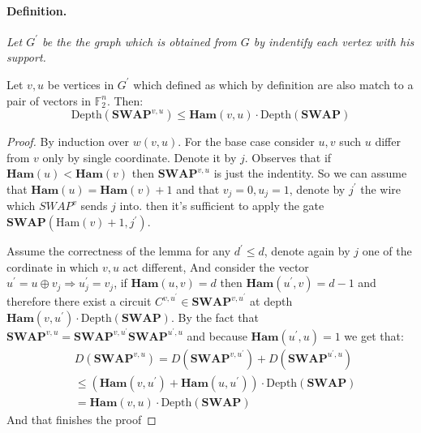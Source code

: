\documentclass{article}
\begin{document}
\paragraph{Definition.} \textit{ Let $G^\prime$ be the the graph which is obtained from $G$ by indentify each vertex with his support. }
\begin{lemma}  Let \(v,u\) be vertices in \(G^{\prime}\) which defined as   which by definition are also match to a pair of vectors in \(\mathbb{F}_2^{n} \). Then: 
  \begin{equation*}
    \text{Depth}\left(\textbf{SWAP}^{v,u}\right) \le \textbf{Ham}(v,u)\cdot \text{Depth}\left(\textbf{SWAP}\right)
  \end{equation*}
\end{lemma}
\begin{proof} By induction over \(w(v,u)\). For the base case consider \(u,v\) such \(u\) differ from \(v\) only by single coordinate. Denote it by \(j\). Observes that if $\textbf{Ham}(u) <\textbf{Ham}(v)$ then $\textbf{SWAP}^{v,u}$ is just the indentity. So we can assume that $ \textbf{Ham}(u) = \textbf{Ham}(v)+1 $ and that  \(v_j = 0, u_j =1\), denote by \(j^{\prime}\) the wire which \(SWAP^{v}\) sends \(j\) into. then it's sufficient to apply the gate \(\textbf{SWAP}(\text{Ham}(v) +1, j^\prime) \).

  Assume the correctness of the lemma for any \(d^\prime \le d\), denote again by $j$ one of the cordinate in which $v,u$ act different, And consider the vector \(u^\prime = u \oplus v_{j} \Rightarrow u^{\prime}_{j} = v_{j}\), if \( \textbf{Ham}(u,v) = d\) then \( \textbf{Ham}(u^\prime,v) = d-1\) and therefore there exist a circuit \(C^{v,u^\prime}\in \textbf{SWAP}^{v,u^\prime}\) at depth \( \textbf{Ham}(v,u^\prime)\cdot\text{Depth}\left(\textbf{SWAP}\right) \). By the fact that \( \textbf{SWAP}^{v,u} = \textbf{SWAP}^{v,u^\prime} \textbf{SWAP}^{u^\prime,u}     \) and because \( \textbf{Ham}(u^\prime,u) = 1 \) we get that:
	\begin{equation*}
	  \begin{split}
	    & D\left(\textbf{SWAP}^{v,u}\right)  =   D\left(\textbf{SWAP}^{v,u^\prime}\right) + D\left( \textbf{SWAP}^{u^\prime,u} \right) \\ 
	    & \le
	    \left(\textbf{Ham}(v,u^\prime) + \textbf{Ham}(u,u^\prime)\right) \cdot\text{Depth}\left(\textbf{SWAP}\right) \\ & =
	    \textbf{Ham}(v,u) \cdot\text{Depth}\left(\textbf{SWAP}\right) 
	  \end{split}
	\end{equation*}
	And that finishes the proof 
      \end{proof}
\end{document}
